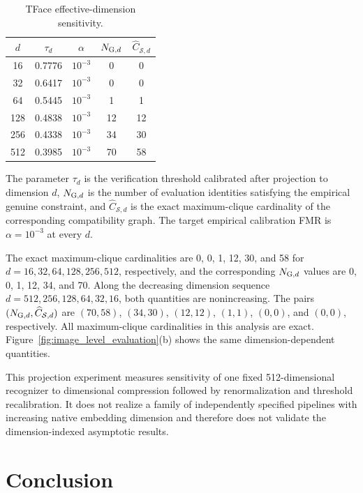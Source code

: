 \documentclass[journal]{IEEEtran}
\begin{document}
\begin{bibunit}
\begin{table}[!b]
\centering
\caption{TFace effective-dimension sensitivity.}
\label{tab:effective_dimension_sensitivity}
\footnotesize
\begin{tabular}{ccccc}
\toprule
$d$
& $\tau_d$
& $\alpha$
& $N_{{\rm G},d}$
& $\widehat C_{\mathcal S,d}$ \\
\midrule
16  & 0.7776 & $10^{-3}$ & 0  & 0  \\
32  & 0.6417 & $10^{-3}$ & 0  & 0  \\
64  & 0.5445 & $10^{-3}$ & 1  & 1  \\
128 & 0.4838 & $10^{-3}$ & 12 & 12 \\
256 & 0.4338 & $10^{-3}$ & 34 & 30 \\
512 & 0.3985 & $10^{-3}$ & 70 & 58 \\
\bottomrule
\end{tabular}
\end{table}

The parameter $\tau_d$ is the verification threshold calibrated after projection to dimension $d$, $N_{{\rm G},d}$ is the number of evaluation identities satisfying the empirical genuine constraint, and $\widehat C_{\mathcal S,d}$ is the exact maximum-clique cardinality of the corresponding compatibility graph. The target empirical calibration FMR is $\alpha=10^{-3}$ at every $d$.

The exact maximum-clique cardinalities are 0, 0, 1, 12, 30, and 58 for $d=16,32,64,128,256,512$, respectively, and the corresponding $N_{{\rm G},d}$ values are 0, 0, 1, 12, 34, and 70. Along the decreasing dimension sequence $d=512,256,128,64,32,16$, both quantities are nonincreasing. The pairs $(N_{{\rm G},d},\widehat C_{\mathcal S,d})$ are $(70,58)$, $(34,30)$, $(12,12)$, $(1,1)$, $(0,0)$, and $(0,0)$, respectively. All maximum-clique cardinalities in this analysis are exact. Figure~\ref{fig:image_level_evaluation}(b) shows the same dimension-dependent quantities.

This projection experiment measures sensitivity of one fixed 512-dimensional recognizer to dimensional compression followed by renormalization and threshold recalibration. It does not realize a family of independently specified pipelines with increasing native embedding dimension and therefore does not validate the dimension-indexed asymptotic results.




\section{Conclusion}
\label{sec:conclusion_main}


\end{bibunit}
\end{document}
